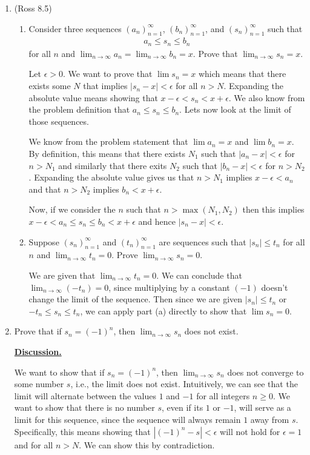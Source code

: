 \documentclass [10pt]{article}
\newcommand{\jg}[1]{{\color{blue} #1}}
\begin{document}
\begin{enumerate}
\clearpage
\item (Ross 8.5)
\begin{enumerate}
\item Consider three sequences $(a_n)_{n=1}^{\infty}$, $(b_n)_{n=1}^{\infty}$, and $(s_n)_{n=1}^{\infty}$ such that
\begin{align*}
a_n \leq s_n \leq b_n
\end{align*}
for all $n$ and $\lim_{n \to \infty} a_n = \lim_{n \to \infty} b_n = x$.
Prove that $\lim_{n \to \infty} s_n= x.$

\jg{
Let $\epsilon > 0$. We want to prove that $\lim s_n = x$ which means that there exists some $N$ that implies $|s_n - x| < \epsilon$ for all $n > N$. Expanding the absolute value means showing that $x - \epsilon < s_n < x + \epsilon$. We also know from the problem definition that $a_n \leq s_n \leq b_n$. Lets now look at the limit of those sequences. 

We know from the problem statement that $\lim a_n = x$ and $\lim b_n = x$. By definition, this means that there exists $N_1$ such that $|a_n - x| < \epsilon$ for $n > N_1$ and similarly that there exits $N_2$ such that $|b_n - x| < \epsilon$ for $n > N_2$. Expanding the absolute value gives us that $n > N_1$ implies $x - \epsilon < a_n$ and that $n > N_2$ implies $b_n < x + \epsilon$. 

Now, if we consider the $n$ such that $n > \max(N_1, N_2)$ then this implies $x - \epsilon < a_n \leq s_n \leq b_n < x + \epsilon$ and hence $|s_n - x| < \epsilon$. 
}

\item Suppose $(s_n)_{n=1}^{\infty}$ and $(t_n)_{n=1}^{\infty}$ are
sequences such that $|s_n|\leq t_n$ for all $n$ and $\lim_{n \to \infty} t_n=0$.
Prove $\lim_{n \to \infty} s_n =0.$

\jg{
We are given that $\lim_{n \to \infty} t_n=0$. We can conclude that $\lim_{n \to \infty} (-t_n)=0$, since multiplying by a constant $(-1)$ doesn't change the limit of the sequence. Then since we are given $|s_n| \leq t_n$ or $-t_n \leq s_n \leq t_n$, we can apply part (a) directly to show that $\lim s_n = 0$.  
}
\end{enumerate}
\clearpage

\item Prove that if $s_n = (-1)^n$, then $\lim_{n \to \infty} s_n$ does not exist.

\jg{
\textbf{\underline{Discussion.}}

We want to show that if $s_n  = (-1)^n$, then $\lim_{n \to \infty} s_n$ does not converge to some number $s$, i.e., the limit does not exist. Intuitively, we can see that the limit will alternate between the values $1$ and $-1$ for all integers $n \geq 0$. We want to show that there is no number $s$, even if its $1$ or $-1$, will serve as a limit for this sequence, since the sequence will always remain $1$ away from $s$. Specifically, this means showing that $|(-1)^n - s| < \epsilon$ will not hold for $\epsilon = 1$ and for all $n > N$. We can show this by contradiction.  \\

}
\end{enumerate}
\end{document}
